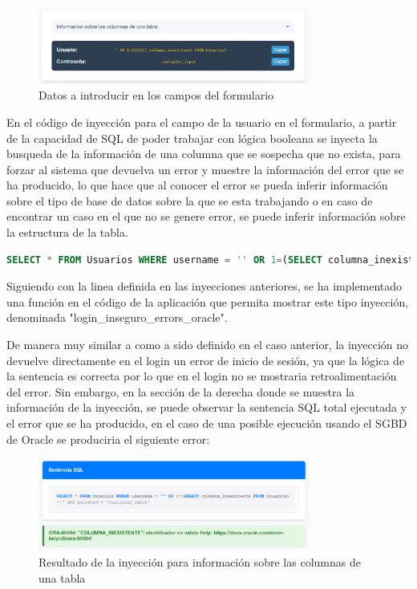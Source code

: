 \documentclass[a4paper,12pt]{article}
\begin{document}
\begin{figure}[H]
    \centering
    \includegraphics[width=0.8\textwidth]{Imagenes/error7.png}
    \caption{Datos a introducir en los campos del formulario}
\end{figure}

En el código de inyección para el campo de la usuario en el formulario,
a partir de la capacidad de SQL de poder trabajar con lógica booleana se inyecta la busqueda de la información de una columna
que se sospecha que no exista, para forzar al sistema que devuelva un error y muestre la información del error que se ha producido,
lo que hace que al conocer el error se pueda inferir información sobre el tipo de base de datos sobre la que se esta trabajando o
en caso de encontrar un caso en el que no se genere error, se puede inferir información sobre la estructura de la tabla.

\begin{lstlisting}[language=SQL]
    SELECT * FROM Usuarios WHERE username = '' OR 1=(SELECT columna_inexistente FROM Usuarios) --' AND password = 'cualquier_input'
\end{lstlisting}

Siguiendo con la linea definida en las inyecciones anteriores, 
se ha implementado una función en el código de la aplicación que permita mostrar este tipo inyección, 
denominada "login\_inseguro\_errors\_oracle".

De manera muy similar a como a sido definido en el caso anterior, la inyección no devuelve directamente en el login un error de inicio de sesión,
ya que la lógica de la sentencia es correcta por lo que en el login no se mostraria retroalimentación del error. Sin embargo,
en la sección de la derecha donde se muestra la información de la inyección, se puede observar la sentencia SQL total ejecutada y el error que se ha producido,
en el caso de una posible ejecución usando el SGBD de Oracle se produciria el siguiente error:

\begin{figure}[H]
    \centering
    \includegraphics[width=0.8\textwidth]{Imagenes/error8.png}
    \caption{Resultado de la inyección para información sobre las columnas de una tabla}
\end{figure}
\end{document}
